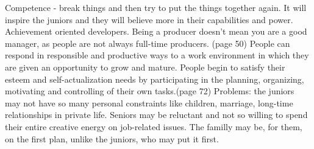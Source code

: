 \documentclass[conference]{IEEEtran}
\begin{document}
Competence - break things and then try to put the things together again. It will inspire the juniors and they will believe more in their capabilities and power. Achievement oriented developers. Being a producer doesn't mean you are a good manager, as people are not always full-time producers. (page 50)
\newline\indent
People can respond in responsible and productive ways to a work environment in which they are given an opportunity to grow and mature. People begin to satisfy their esteem and self-actualization needs by participating in the planning, organizing, motivating and controlling of their own tasks.(page 72)
\newline\indent
Problems: the juniors may not have so many personal constraints like children, marriage, long-time relationships in private life. Seniors may be reluctant and not so willing to spend their entire creative energy on job-related issues. The familly may be, for them, on the first plan, unlike the juniors, who may put it first.
\end{document}
